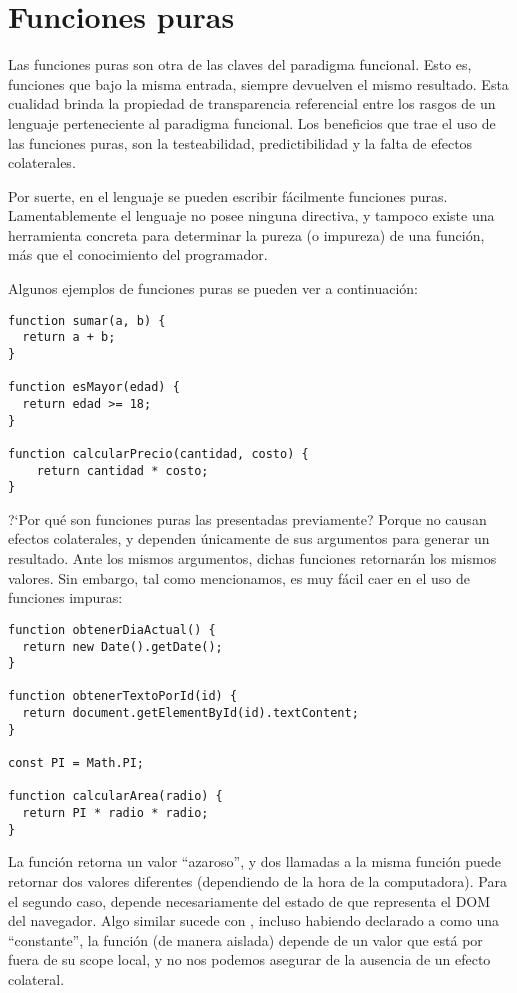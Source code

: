 \section{Funciones puras}

Las funciones puras son otra de las claves del paradigma funcional. Esto es, funciones que bajo la misma entrada, siempre devuelven el mismo resultado. Esta cualidad brinda la propiedad de transparencia referencial entre los rasgos de un lenguaje perteneciente al paradigma funcional. Los beneficios que trae el uso de las funciones puras, son la testeabilidad, predictibilidad y la falta de efectos colaterales.

Por suerte, en el lenguaje se pueden escribir fácilmente funciones puras. Lamentablemente el lenguaje no posee ninguna directiva, y tampoco existe una herramienta concreta para determinar la pureza (o impureza) de una función, más que el conocimiento del programador.

Algunos ejemplos de funciones puras se pueden ver a continuación:

\begin{lstlisting}[title={Funciones puras}]
function sumar(a, b) {
  return a + b;
}

function esMayor(edad) {
  return edad >= 18;
}

function calcularPrecio(cantidad, costo) {
	return cantidad * costo;
}
\end{lstlisting}

?`Por qué son funciones puras las presentadas previamente? Porque no causan efectos colaterales, y dependen únicamente de sus argumentos para generar un resultado. Ante los mismos argumentos, dichas funciones retornarán los mismos valores. Sin embargo, tal como mencionamos, es muy fácil caer en el uso de funciones impuras:

\begin{lstlisting}[title={Funciones impuras}]
function obtenerDiaActual() {
  return new Date().getDate();
}

function obtenerTextoPorId(id) {
  return document.getElementById(id).textContent;
}

const PI = Math.PI;

function calcularArea(radio) {
  return PI * radio * radio;
}
\end{lstlisting}

La función  retorna un valor "`azaroso"', y dos llamadas a la misma función puede retornar dos valores diferentes (dependiendo de la hora de la computadora). Para el segundo caso,  depende necesariamente del estado de  que representa el DOM del navegador. Algo similar sucede con , incluso habiendo declarado a  como una "`constante"', la función (de manera aislada) depende de un valor que está por fuera de su scope local, y no nos podemos asegurar de la ausencia de un efecto colateral.

